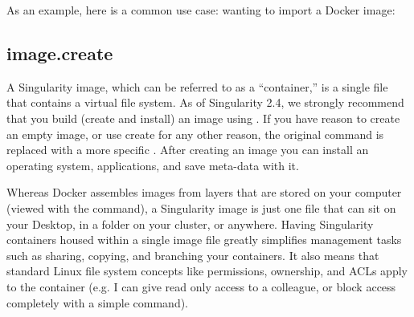 \documentclass[letterpaper,10pt,english]{sphinxmanual}
\begin{document}
As an example, here is a common use case: wanting to import a Docker
image:

%
\begin{sphinxVerbatim}[commandchars=\\\{\}]
   
\end{sphinxVerbatim}


\subsection{image.create}
\label{\detokenize{appendix:id44}}\label{\detokenize{appendix:sec-imagecreate}}
A Singularity image, which can be referred to as a “container,” is a
single file that contains a virtual file system. As of Singularity
2.4, we strongly recommend that you build (create and install) an
image using . If you have reason to create an empty image, or use
create for any other reason, the original  command is replaced with a
more specific . After creating an image you can install an operating
system, applications, and save meta-data with it.

Whereas Docker assembles images from layers that are stored on your
computer (viewed with the  command), a Singularity image is just one
file that can sit on your Desktop, in a folder on your cluster, or
anywhere. Having Singularity containers housed within a single image
file greatly simplifies management tasks such as sharing, copying, and
branching your containers. It also means that standard Linux file
system concepts like permissions, ownership, and ACLs apply to the
container (e.g. I can give read only access to a colleague, or block
access completely with a simple  command).
\end{document}
